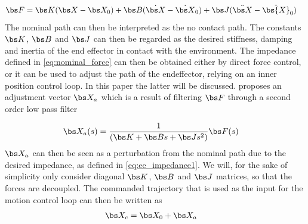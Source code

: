 \begin{align}
	\bs F&=\bs K(\bs X - \bs X_0) + \bs B(\dot{\bs X} - \dot{\bs X}_0) + \bs J(\ddot{\bs X} - \ddot{\bs{X}}_0)
	\label{eq:ee_impedance1}
\end{align}
The nominal path can then be interpreted as the no contact path. The constants $\bs K$, $\bs B$ and $\bs J$ can then be regarded as the desired stiffness, damping and inertia of the end effector in contact with the environment. The impedance defined in \eqref{eq:nominal_force} can then be obtained either by direct force control, or it can be used to adjust the path of the endeffector, relying on an inner position control loop. In this paper the latter will be discussed. \cite{impedance_stability} proposes an adjustment vector $\bs X_a$ which is a result of filtering $\bs F$ through a second order low pass filter

\begin{align}
	\bs X_a(s)&= \frac{1}{(\bs K+\bs Bs+ \bs Js^2)}\bs F(s)
	\label{eq:x_adjusted}
\end{align}
$\bs X_a$ can then be seen as a perturbation from the nominal path due to the desired impedance, as defined in \eqref{eq:ee_impedance1}. We will, for the sake of simplicity only consider diagonal $\bs K$, $\bs B$ and $\bs J$ matrices, so that the forces are decoupled. The commanded trajectory that is used as the input for the motion control loop can then be written as
\begin{align}
	\bs X_c&= \bs X_0 + \bs X_a
	\label{eq:controlled_traj}
\end{align}




